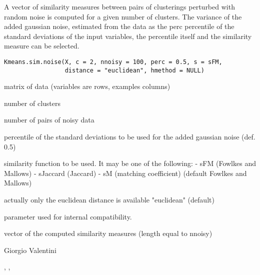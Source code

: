 \documentclass{article}
\begin{document}
\begin{Description}\relax
A vector of similarity measures between pairs of clusterings perturbed with random noise is computed for a given number of clusters. 
The variance of the added gaussian noise, estimated from the data as the perc percentile of the standard deviations of the input variables,
the percentile itself and the similarity measure can be selected.
\end{Description}
\begin{Usage}
\begin{verbatim}
Kmeans.sim.noise(X, c = 2, nnoisy = 100, perc = 0.5, s = sFM, 
                 distance = "euclidean", hmethod = NULL)
\end{verbatim}
\end{Usage}
\begin{Arguments}
\begin{ldescription}
\item[\code{X}] matrix of data (variables are rows, examples columns) 
\item[\code{c}] number of clusters 
\item[\code{nnoisy}] number of pairs of noisy data 
\item[\code{perc}] percentile of the standard deviations to be used for the added gaussian noise (def. 0.5) 
\item[\code{s}] similarity function to be used. It may be one of the following: 
- sFM (Fowlkes and Mallows)
- sJaccard (Jaccard)
- sM (matching coefficient)
(default Fowlkes and Mallows) 
\item[\code{distance}] actually only the euclidean distance is available "euclidean" (default) 
\item[\code{hmethod}] parameter used for internal compatibility. 
\end{ldescription}
\end{Arguments}
\begin{Value}
vector of the computed similarity measures (length equal to nnoisy)
\end{Value}
\begin{Author}\relax
Giorgio Valentini 
\end{Author}
\begin{SeeAlso}\relax
{}, , 
\end{SeeAlso}
\end{document}
